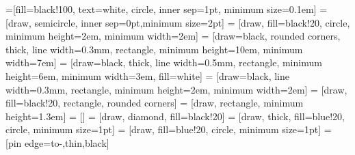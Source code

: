 \usetikzlibrary{shapes,arrows}
\usetikzlibrary{backgrounds}
\usetikzlibrary{matrix, positioning, fit}
\usetikzlibrary{patterns}

 =[fill=black!100, text=white, circle, inner sep=1pt, minimum size=0.1em]
 = [draw, semicircle, inner sep=0pt,minimum size=2pt]
 = [draw, fill=black!20, circle, minimum height=2em, minimum width=2em]
 = [draw=black, rounded corners, thick, line width=0.3mm, rectangle, minimum height=10em, minimum width=7em]
 = [draw=black, thick, line width=0.5mm, rectangle, minimum height=6em, minimum width=3em, fill=white]
 = [draw=black, line width=0.3mm, rectangle, minimum height=2em, minimum width=2em]
 = [draw, fill=black!20, rectangle, rounded corners]
 = [draw, rectangle, minimum height=1.3em]
 = []
 = [draw, diamond, fill=black!20]
 = [draw, thick, fill=blue!20, circle, minimum size=1pt]
 = [draw, fill=blue!20, circle, minimum size=1pt]
 = [pin edge={to-,thin,black}]


